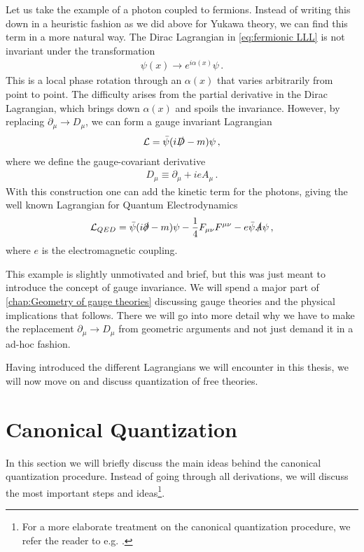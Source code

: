Let us take the example of a photon coupled to fermions. Instead of writing this down in a heuristic fashion as we did above for Yukawa theory, we can find this term in a more natural way. The Dirac Lagrangian in \cref{eq:fermionic LLL} is not invariant under the transformation
\begin{align}
    \psi(x)\rightarrow e^{i\alpha(x)}\psi\,.
\end{align}
This is a local phase rotation through an  $\alpha(x)$ that varies arbitrarily from point to point. The difficulty arises from the partial derivative in the Dirac Lagrangian, which brings down $\alpha(x)$ and spoils the invariance. However, by replacing $\partial_{\mu}\rightarrow D_{\mu}$, we can form a gauge invariant Lagrangian
\begin{align}
    \mathcal{L}=\bar{\psi}(i\slashed{D}-m)\psi\,,
\end{align}
where we define the gauge-covariant derivative
\begin{align}
    D_{\mu}\equiv\partial_{\mu}+ieA_{\mu}\,.
\end{align}
With this construction one can add the kinetic term for the photons, giving the well known Lagrangian for Quantum Electrodynamics
\begin{align}
    \mathcal{L}_{QED}=\bar{\psi}(i\slashed{\partial}-m)\psi-\frac{1}{4}F_{\mu\nu}F^{\mu\nu}-e\bar{\psi}\slashed{A}\psi\,,
\end{align}
where $e$ is the electromagnetic coupling.

This example is slightly unmotivated and brief, but this was just meant to introduce the concept of gauge invariance. We will spend a major part of \cref{chap:Geometry of gauge theories} discussing gauge theories and the physical implications that follows. There we will go into more detail why we have to make the replacement $\partial_{\mu}\rightarrow D_{\mu}$ from geometric arguments and not just demand it in a ad-hoc fashion.

Having introduced the different Lagrangians we will encounter in this thesis, we will now move on and discuss quantization of free theories.



\newpage
\section{Canonical Quantization}\label{sec:canonical quantization free theories}
In this section we will briefly discuss the main ideas behind the canonical quantization procedure. Instead of going through all derivations, we will discuss the most important steps and ideas\footnote{For a more elaborate treatment on the canonical quantization procedure, we refer the reader to e.g. \cite{Peskin:257493, sterman_1993}.}.

